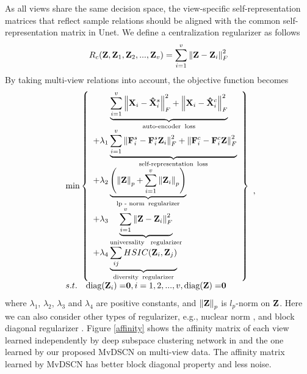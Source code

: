 \documentclass[journal]{IEEEtran}
\begin{document}
As all views share the same decision space, the view-specific self-representation matrices that reflect sample relations should be aligned with the common self-representation matrix in Unet. We define a centralization regularizer as follows
\begin{equation}\label{Cengru}
{R_c}({{\bf{Z}}},{{\bf{Z}}_1},{{\bf{Z}}_2},...,{{\bf{Z}}_v}) = \sum\limits_{i = 1}^v {\left\| {{\bf{Z}} - {{\bf{Z}}_i}} \right\|_F^2}
\end{equation}
By taking multi-view relations into account, the objective function becomes
\begin{equation}\label{objective}
\begin{array}{l}
 \min \left\{ \begin{array}{ll}
 \qquad \underbrace {\sum\limits_{i = 1}^v {\left\| {{{\bf{X}}_i} - {\bf{\hat X}}_i^s} \right\|_F^2 + \left\| {{{\bf{X}}_i} - {\bf{\hat X}}_i^c} \right\|_F^2} }_\text{auto-encoder\;\;loss}
  \\
  + {\lambda _1} \underbrace {\sum\limits_{i = 1}^v {\left\| {{\bf{F}}_i^s - {\bf{F}}_i^s{{\bf{Z}}_i}} \right\|_F^2 + \left\| {{\bf{F}}_i^c - {\bf{F}}_i^c{\bf{Z}}} \right\|_F^2} }_\text{self-representation\;\;loss} \\
 {\rm{ + }}{\lambda _2}\underbrace {\left( {\left\| {\bf{Z}} \right\|_p^{}{\rm{ + }}\sum\limits_{i = 1}^v {\left\| {{{\bf{Z}}_i}} \right\|_p^{}} } \right)}_\text{lp - norm\;\;regularizer} \\
 {\rm{ + }}{\lambda _3}\underbrace {\sum\limits_{i = 1}^v {\left\| {{\bf{Z}} - {{\bf{Z}}_i}} \right\|_F^2} }_\text{universality\;\; regularizer} \\
  + {\lambda _4}\underbrace {\sum\limits_{ij} {HSIC({{\bf{Z}}_i},{{\bf{Z}}_j})} }_\text{diversity\;\;regularizer} \\
 \end{array} \right\} \\
 s.t.\quad{\rm{ diag(}}{{\bf{Z}}_i}{\rm{) = }}{\bf{0}},i = 1,2,...,v,{\rm{diag(}}{\bf{Z}}{\rm{) = }}{\bf{0}} \\
 \end{array},
\end{equation}
where $\lambda_1$, $\lambda_2$, $\lambda_3$ and $\lambda_4$ are positive constants, and $\left\| {\bf{Z}} \right\|_p^{}$ is $l_p$-norm on $\bf{Z}$. Here we can also consider other types of regularizer, e.g., nuclear norm \cite{Guangcan2013Robust}, and block diagonal regularizer \cite{lu2019subspace}.
Figure \ref{affinity} shows the affinity matrix of each view learned independently by deep subspace clustering network in \cite{ji2017deep} and the one learned by our proposed MvDSCN on multi-view data.  The affinity matrix learned by MvDSCN has better block diagonal property and less noise.
\end{document}
